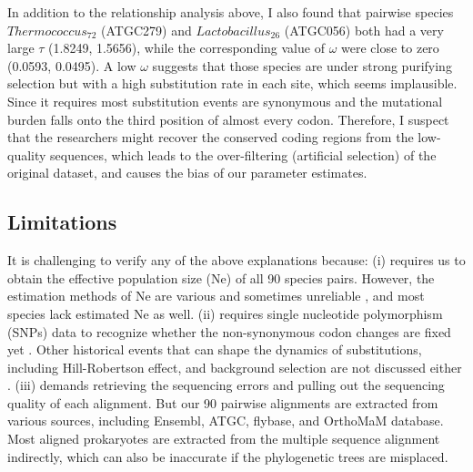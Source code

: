 \indent In addition to the relationship analysis above, I also found that pairwise species $Thermococcus_{72}$ (ATGC279) and $Lactobacillus_{26}$ (ATGC056) both had a very large $\tau$ (1.8249, 1.5656), while the corresponding value of $\omega$ were close to zero (0.0593, 0.0495). A low $\omega$ suggests that those species are under strong purifying selection but with a high substitution rate in each site, which seems implausible. Since it requires most substitution events are synonymous and the mutational burden falls onto the third position of almost every codon. Therefore, I suspect that the researchers might recover the conserved coding regions from the low-quality sequences, which leads to the over-filtering (artificial selection) of the original dataset, and causes the bias of our parameter estimates. 


\subsection{Limitations}
It is challenging to verify any of the above explanations because: (i) requires us to obtain the effective population size (Ne) of all 90 species pairs. However, the estimation methods of Ne are various and sometimes unreliable \parencite{wang2016prediction}, and most species lack estimated Ne as well. (ii) requires single nucleotide polymorphism (SNPs) data to recognize whether the non-synonymous codon changes are fixed yet \parencite{ochman2003neutral}. Other historical events that can shape the dynamics of substitutions, including Hill-Robertson effect, and background selection are not discussed either \parencite{comeron2008hill}. (iii) demands retrieving the sequencing errors and pulling out the sequencing quality of each alignment. But our 90 pairwise alignments are extracted from various sources, including Ensembl, ATGC, flybase, and OrthoMaM database. Most aligned prokaryotes are extracted from the multiple sequence alignment indirectly, which can also be inaccurate if the phylogenetic trees are misplaced. 

   











%
%
